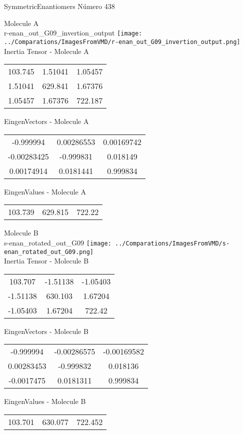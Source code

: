 \vtab[-2cm]
\begin{center}
{\large SymmetricEnantiomers \tab Número 438}
\end{center}
\begin{multicols}{2}
\begin{center}

Molecule A \\ 
r-enan\_out\_G09\_invertion\_output
\texttt{[image: ../Comparations/ImagesFromVMD/r-enan\_out\_G09\_invertion\_output.png]}
\\
Inertia Tensor - Molecule A \\
\vtab

\begin{tabular}{|c c c|}
103.745	 & 	1.51041	 & 	1.05457	 \\
1.51041	 & 	629.841	 & 	1.67376	 \\
1.05457	 & 	1.67376	 & 	722.187
\end{tabular}

\vtab
 EingenVectors - Molecule A     \\
\vtab
\begin{tabular}{|c c c|}
-0.999994	 & 	0.00286553	 & 	0.00169742	 \\
-0.00283425	 & 	-0.999831	 & 	0.018149	 \\
0.00174914	 & 	0.0181441	 & 	0.999834
\end{tabular}

\vtab
 EingenValues - Molecule A     \\
\vtab
\begin{tabular}{|c c c|}
103.739	 & 	629.815	 & 	722.22	 \\
\end{tabular}
\columnbreak

Molecule B \\ 
s-enan\_rotated\_out\_G09
\texttt{[image: ../Comparations/ImagesFromVMD/s-enan\_rotated\_out\_G09.png]}
\\
Inertia Tensor - Molecule B \\
\vtab

\begin{tabular}{|c c c|}
103.707	 & 	-1.51138	 & 	-1.05403	 \\
-1.51138	 & 	630.103	 & 	1.67204	 \\
-1.05403	 & 	1.67204	 & 	722.42
\end{tabular}

\vtab
 EingenVectors - Molecule B     \\
\vtab
\begin{tabular}{|c c c|}
-0.999994	 & 	-0.00286575	 & 	-0.00169582	 \\
0.00283453	 & 	-0.999832	 & 	0.018136	 \\
-0.0017475	 & 	0.0181311	 & 	0.999834
\end{tabular}

\vtab
 EingenValues - Molecule B     \\
\vtab
\begin{tabular}{|c c c|}
103.701	 & 	630.077	 & 	722.452	 \\
\end{tabular}

\end{center}
\end{multicols}

